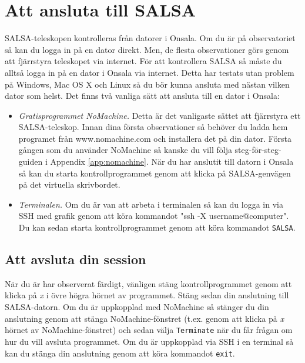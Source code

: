 \section{Att ansluta till SALSA} 
\label{sect:connect}
SALSA-teleskopen kontrolleras från datorer i Onsala. Om du är på 
observatoriet så kan du logga in på en dator direkt. Men, de flesta observationer
görs genom att fjärrstyra teleskopet via internet. För att kontrollera SALSA
så måste du alltså logga in på en dator i Onsala via internet. Detta har 
testats utan problem på Windows, Mac OS X och Linux så du bör kunna ansluta 
med nästan vilken dator som helst. Det finns två vanliga sätt att ansluta
till en dator i Onsala:

\begin{itemize}
	\item{\emph{Gratisprogrammet NoMachine.} Detta är det vanligaste
			sättet att fjärrstyra ett SALSA-teleskop. Innan dina första 
			observationer så behöver du ladda hem programet från 
			www.nomachine.com och installera det på din dator. Första gången
			som du använder NoMachine så kanske du vill följa steg-för-steg-guiden
			i Appendix \ref{app:nomachine}. När du har anslutit till datorn i Onsala
			så kan du starta kontrollprogrammet genom att klicka på SALSA-genvägen
		på det virtuella skrivbordet. }
\item{\emph{Terminalen.} Om du är van att arbeta i terminalen så kan du 
		logga in via SSH med grafik genom att köra kommandot 
		"ssh -X username@computer".  Du kan sedan starta kontrollprogrammet
		genom att köra kommandot {\tt  SALSA}.}
\end{itemize}

\subsection{Att avsluta din session}
När du är har observerat färdigt, vänligen stäng kontrollprogrammet genom
att klicka på \emph{x} i övre högra hörnet av programmet. Stäng sedan din 
anslutning till SALSA-datorn. Om du är uppkopplad med NoMachine så stänger
du din anslutning genom att stänga NoMachine-fönstret (t.ex. genom att
klicka på \emph{x} hörnet av NoMachine-fönstret) och sedan välja 
{\tt Terminate} när du får frågan om hur du vill avsluta programmet. 
Om du är uppkopplad via SSH i en terminal så kan du stänga din anslutning
genom att köra kommandot {\tt exit}.

